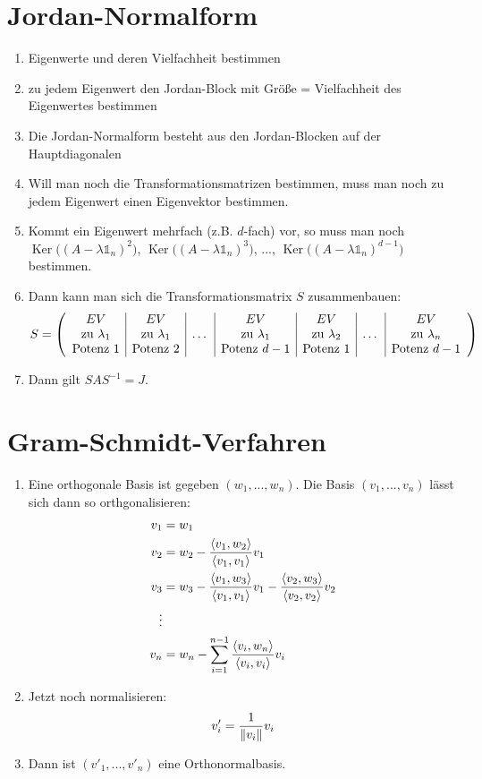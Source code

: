 \documentclass[ngerman,a4paper]{article}
\DeclareMathOperator{\Ker}{Ker}
\begin{document}
\section{Jordan-Normalform}
\begin{enumerate}[label=\textbf{\arabic*.}]
	\item Eigenwerte und deren Vielfachheit bestimmen
	\item zu jedem Eigenwert den Jordan-Block mit Gr\"o{\ss}e = Vielfachheit des Eigenwertes bestimmen
	\item Die Jordan-Normalform besteht aus den Jordan-Blocken auf der Hauptdiagonalen
	\item Will man noch die Transformationsmatrizen bestimmen, muss man noch zu jedem Eigenwert einen Eigenvektor bestimmen.
	\item Kommt ein Eigenwert mehrfach (z.B. $d$-fach) vor, so muss man noch $\Ker\big((A-\lambda\mathbb{1}_n)^2\big)$, $\Ker\big((A-\lambda\mathbb{1}_n)^3\big)$, ..., $\Ker\big((A-\lambda\mathbb{1}_n)^{d-1}\big)$ bestimmen.
	\item Dann kann man sich die Transformationsmatrix $S$ zusammenbauen:
	\begin{align}
		S = \left(\begin{array}{c|c|c|c|c|c|c}
		EV & EV &  & EV & EV &  & EV \\
		\text{zu }\lambda_1 & \text{zu }\lambda_1 & \dots & \text{zu }\lambda_1 & \text{zu }\lambda_2 & \dots & \text{zu }\lambda_n \\
		\text{Potenz }1 & \text{Potenz }2 & & \text{Potenz }d-1 & \text{Potenz }1 & & \text{Potenz }d-1
		\end{array}\right)\notag
	\end{align}
	\item Dann gilt $SAS^{-1}=J$.
\end{enumerate}

\section{Gram-Schmidt-Verfahren}
\begin{enumerate}[label=\textbf{\arabic*.}]
	\item Eine orthogonale Basis ist gegeben $(w_1,...,w_n)$. Die Basis $(v_1,...,v_n)$ l\"asst sich dann so orthgonalisieren:
	\begin{align}
		v_1 &= w_1 \notag \\
		v_2 &= w_2 - \frac{\langle v_1,w_2 \rangle}{\langle v_1,v_1 \rangle}v_1 \notag \\
		v_3 &= w_3 - \frac{\langle v_1,w_3\rangle}{\langle v_1,v_1\rangle}v_1 - \frac{\langle v_2,w_3\rangle}{\langle v_2,v_2\rangle}v_2 \notag \\
		\vdots \notag \\
		v_n &= w_n - \sum_{i=1}^{n-1} \frac{\langle v_i,w_n\rangle}{\langle v_i,v_i\rangle}v_i\notag
	\end{align}
	\item Jetzt noch normalisieren:
	\begin{align}
		v'_i = \frac{1}{\Vert v_i\Vert}v_i\notag
	\end{align}
	\item Dann ist $(v'_1,...,v'_n)$ eine Orthonormalbasis.
\end{enumerate}
\end{document}
